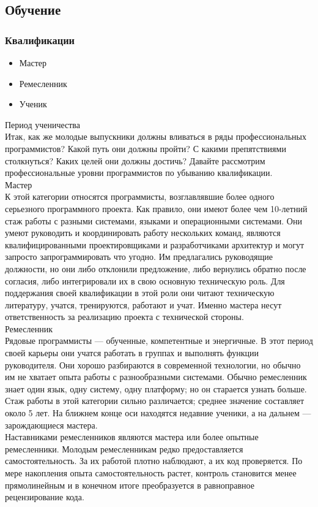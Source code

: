 \documentclass{../industrial-development}
\begin{document}
\subsection{Обучение}
\begin{frame} \frametitle{Квалификации}
\begin{itemize}
  \item Мастер
  \item Ремесленник
	\item Ученик
\end{itemize}
\end{frame}
\lecturenotes
Период ученичества\\
Итак, как же молодые выпускники должны вливаться в ряды профессиональных программистов? Какой путь они должны пройти? С какими препятствиями столкнуться? Каких целей они должны достичь? Давайте рассмотрим профессиональные уровни программистов по убыванию квалификации.\\
Мастер\\
К этой категории относятся программисты, возглавлявшие более одного серьезного программного проекта. Как правило, они имеют более чем 10-летний стаж работы с разными системами, языками и операционными системами. Они умеют руководить и координировать работу нескольких команд, являются квалифицированными проектировщиками и разработчиками архитектур и могут запросто запрограммировать что угодно. Им предлагались руководящие должности, но они либо отклонили предложение, либо вернулись обратно после согласия, либо интегрировали их в свою основную техническую роль. Для поддержания своей квалификации в этой роли они читают техническую литературу, учатся, тренируются, работают и учат. Именно мастера несут ответственность за реализацию проекта с технической стороны.\\
Ремесленник\\
Рядовые программисты — обученные, компетентные и энергичные. В этот период своей карьеры они учатся работать в группах и выполнять функции руководителя. Они хорошо разбираются в современной
технологии, но обычно им не хватает опыта работы с разнообразными системами. Обычно ремесленник знает один язык, одну систему, одну платформу; но он старается узнать больше. Стаж работы в этой категории сильно различается; среднее значение составляет около 5 лет. На ближнем конце оси находятся недавние ученики, а на дальнем — зарождающиеся мастера.\\
Наставниками ремесленников являются мастера или более опытные ремесленники. Молодым ремесленникам редко предоставляется самостоятельность. За их работой плотно наблюдают, а их код проверяется. По мере накопления опыта самостоятельность растет, контроль становится менее прямолинейным и в конечном итоге преобразуется в равноправное рецензирование кода.
\end{document}
